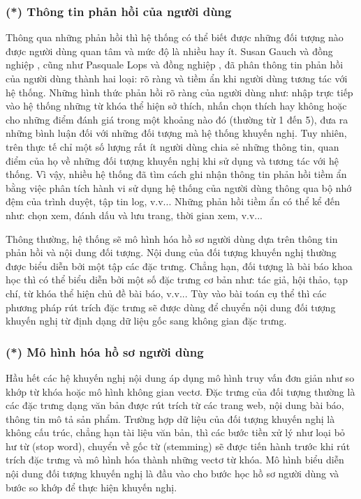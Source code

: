 \subsubsection*{(*) Thông tin phản hồi của người dùng}
Thông qua những phản hồi thì hệ thống có thể biết được những đối tượng nào được người dùng quan tâm và mức độ là nhiều hay ít. Susan Gauch và đồng nghiệp \cite{Gauch:2007}, cũng như Pasquale Lops và đồng nghiệp \cite{Lops2011CBRecSys}, đã phân thông tin phản hồi của người dùng thành hai loại: rõ ràng và tiềm ẩn khi người dùng tương tác với hệ thống. Những hình thức phản hồi rõ ràng của người dùng như: nhập trực tiếp vào hệ thống những từ khóa thể hiện sở thích, nhấn chọn thích hay không hoặc cho những điểm đánh giá trong một khoảng nào đó (thường từ 1 đến 5), đưa ra những bình luận đối với những đối tượng mà hệ thống khuyến nghị. Tuy nhiên, trên thực tế chỉ một số lượng rất ít người dùng chia sẻ những thông tin, quan điểm của họ về những đối tượng khuyến nghị khi sử dụng và tương tác với hệ thống. Vì vậy, nhiều hệ thống đã tìm cách ghi nhận thông tin phản hồi tiềm ẩn bằng việc phân tích hành vi sử dụng hệ thống của người dùng thông qua bộ nhớ đệm của trình duyệt, tập tin log, v.v... Những phản hồi tiềm ẩn có thể kể đến như: chọn xem, đánh dấu và lưu trang, thời gian xem, v.v... 

Thông thường, hệ thống sẽ mô hình hóa hồ sơ người dùng dựa trên thông tin phản hồi và nội dung đối tượng. Nội dung của đối tượng khuyến nghị thường được biểu diễn bởi một tập các đặc trưng. Chẳng hạn, đối tượng là bài báo khoa học thì có thể biểu diễn bởi một số đặc trưng cơ bản như: tác giả, hội thảo, tạp chí, từ khóa thể hiện chủ đề bài báo, v.v... Tùy vào bài toán cụ thể thì các phương pháp rút trích đặc trưng sẽ được dùng để chuyển nội dung đối tượng khuyến nghị từ định dạng dữ liệu gốc sang không gian đặc trưng. 

\subsubsection*{(*) Mô hình hóa hồ sơ người dùng}
Hầu hết các hệ khuyến nghị nội dung áp dụng mô hình truy vấn đơn giản như so khớp từ khóa hoặc mô hình không gian vectơ. Đặc trưng của đối tượng thường là các đặc trưng dạng văn bản được rút trích từ các trang web, nội dung bài báo, thông tin mô tả sản phẩm. Trường hợp dữ liệu của đối tượng khuyến nghị là không cấu trúc, chẳng hạn tài liệu văn bản, thì các bước tiền xử lý như loại bỏ hư từ (stop word), chuyển về gốc từ (stemming) sẽ được tiến hành trước khi rút trích đặc trưng và mô hình hóa thành những vectơ từ khóa. Mô hình biểu diễn nội dung đối tượng khuyến nghị là đầu vào cho bước học hồ sơ người dùng và bước so khớp để thực hiện khuyến nghị. 

